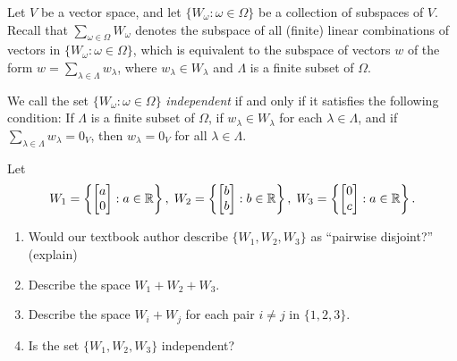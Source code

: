 \begin{ProbBox} %
Let $V$ be a vector space, and let
$\{W_\omega : \omega \in \Omega\}$ be a collection of subspaces of $V$.
Recall that $\sum_{\omega \in \Omega}W_\omega$ denotes the subspace of all
(finite) linear combinations of vectors in $\{W_\omega : \omega \in \Omega\}$,
which is equivalent to the subspace of vectors $w$ of the form
$w = \sum_{\lambda \in \Lambda}w_\lambda$, where $w_\lambda \in W_\lambda$ and
$\Lambda$ is a finite subset of $\Omega$.

We call the set $\{W_\omega : \omega \in \Omega\}$ \emph{independent} if and
only if it satisfies the following condition:
If $\Lambda$ is a finite subset of $\Omega$, if $w_\lambda \in W_\lambda$ for
each $\lambda \in \Lambda$, and if $\sum_{\lambda\in \Lambda} w_\lambda = 0_V$,
then $w_\lambda = 0_V$ for all $\lambda \in \Lambda$.


\begin{problem}
Let 
\[W_1 = \left\{\begin{bmatrix}  a \\ 0\end{bmatrix} : a\in \mathbb{R} \right\},  \;
W_2 = \left\{\begin{bmatrix}  b \\ b\end{bmatrix} : b\in \mathbb{R}\right\}, \; 
W_3 = \left\{\begin{bmatrix}  0 \\ c\end{bmatrix} : a\in \mathbb{R}\right\}.
\]  

\begin{enumerate}
\item Would our textbook author describe $\{W_1, W_2, W_3\}$ as ``pairwise disjoint?'' (explain)
\item Describe the space $W_1 + W_2 + W_3$.
\item Describe the space $W_i + W_j$ for each pair $i\neq j$ in $\{1,2,3\}$.  
\item Is the set $\{W_1, W_2, W_3\}$ independent?
\end{enumerate}
\end{problem}
\end{ProbBox}
